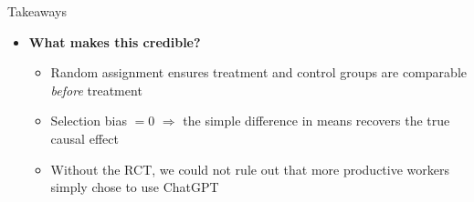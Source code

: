 \documentclass[hyperref={pdfpagelabels=false}]{beamer}
\begin{document}
\begin{frame}{Takeaways}
	\begin{itemize}
		\item \textbf{What makes this credible?}
		\vspace{0.2cm}
		\begin{itemize}
			\item Random assignment ensures treatment and control groups are comparable \emph{before} treatment
			\vspace{0.2cm}
			\item Selection bias $= 0$ $\Rightarrow$ the simple difference in means recovers the true causal effect
			\vspace{0.2cm}
			\item Without the RCT, we could not rule out that more productive workers simply chose to use ChatGPT
		\end{itemize}
	\end{itemize}
\end{frame}
	
\end{document}
